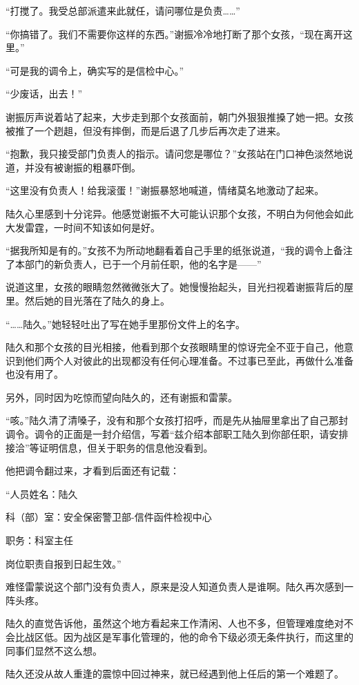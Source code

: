 “打搅了。我受总部派遣来此就任，请问哪位是负责……”

“你搞错了。我们不需要你这样的东西。”谢振冷冷地打断了那个女孩，“现在离开这里。”

“可是我的调令上，确实写的是信检中心。”

“少废话，出去！”

谢振厉声说着站了起来，大步走到那个女孩面前，朝门外狠狠推搡了她一把。女孩被推了一个趔趄，但没有摔倒，而是后退了几步后再次走了进来。

“抱歉，我只接受部门负责人的指示。请问您是哪位？”女孩站在门口神色淡然地说道，并没有被谢振的粗暴吓倒。

“这里没有负责人！给我滚蛋！”谢振暴怒地喊道，情绪莫名地激动了起来。

陆久心里感到十分诧异。他感觉谢振不大可能认识那个女孩，不明白为何他会如此大发雷霆，一时间不知该如何是好。

“据我所知是有的。”女孩不为所动地翻看着自己手里的纸张说道，“我的调令上备注了本部门的新负责人，已于一个月前任职，他的名字是——”

说道这里，女孩的眼睛忽然微微张大了。她慢慢抬起头，目光扫视着谢振背后的屋里。然后她的目光落在了陆久的身上。

“……陆久。”她轻轻吐出了写在她手里那份文件上的名字。

陆久和那个女孩的目光相接，他看到那个女孩眼睛里的惊讶完全不亚于自己，他意识到他们两个人对彼此的出现都没有任何心理准备。不过事已至此，再做什么准备也没有用了。

另外，同时因为吃惊而望向陆久的，还有谢振和雷蒙。

“咳。”陆久清了清嗓子，没有和那个女孩打招呼，而是先从抽屉里拿出了自己那封调令。调令的正面是一封介绍信，写着“兹介绍本部职工陆久到你部任职，请安排接洽”等证明信息，但关于职务的信息他没看到。

他把调令翻过来，才看到后面还有记载：

“人员姓名：陆久

科（部）室：安全保密警卫部-信件函件检视中心

职务：科室主任

岗位职责自报到日起生效。”

难怪雷蒙说这个部门没有负责人，原来是没人知道负责人是谁啊。陆久再次感到一阵头疼。

陆久的直觉告诉他，虽然这个地方看起来工作清闲、人也不多，但管理难度绝对不会比战区低。因为战区是军事化管理的，他的命令下级必须无条件执行，而这里的同事们显然不这么想。

陆久还没从故人重逢的震惊中回过神来，就已经遇到他上任后的第一个难题了。

